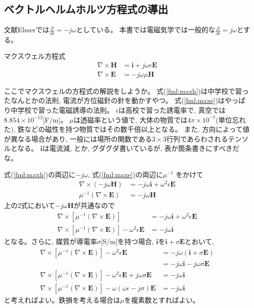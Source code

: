 \subsection{ベクトルヘルムホルツ方程式の導出}

文献Elmerでは$\frac{\partial}{\partial t}=-j\omega$としている。
本書では電磁気学では一般的な$\frac{\partial}{\partial t}=j\omega$とする。

マクスウェル方程式
\begin{align}
\nabla\times\bm{H}&=\bm{i}+j\omega\epsilon\bm{E}\label{fml:maxh}\\
\nabla\times\bm{E}&=-j\omega\mu\bm{H}\label{fml:maxe}
\end{align}

ここでマクスウェルの方程式の解説をしようか。
式(\ref{fml:maxh})は中学校で習ったなんとかの法則,
電流が方位磁針の針を動かすやつ。
式(\ref{fml:maxe})はやっぱり中学校で習った電磁誘導の法則。
$\epsilon$は高校で習った誘電率で,
真空では$8.854\times10^{-12}$[F/m]。
$\mu$は透磁率という値で,
大体の物質では$4\pi\times10^{-7}$(単位忘れた),
鉄などの磁性を持つ物質ではその数千倍以上となる。
また, 方向によって値が異なる場合があり,
一般には場所の関数である$3\times3$行列であらわされるテンソルとなる。
$\bm{i}$は電流減, とか, グダグダ書いているが, 表か箇条書きにすべきだな。

式(\ref{fml:maxh})の両辺に$-j\omega$,
式(\ref{fml:maxe})の両辺に$\mu^{-1}$ をかけて
\begin{align}
\nabla\times\left(-j\omega\bm{H}\right)
&=-j\omega\bm{i}+\omega^2\epsilon\bm{E}\\
\mu^{-1}\left(\nabla\times\bm{E}\right)
&=-j\omega\bm{H}
\end{align}
上の2式において$-j\omega\bm{H}$が共通なので
\begin{align}
\nabla\times\left[
\mu^{-1}\left(\nabla\times\bm{E}\right)
\right]
&=-j\omega\bm{i}+\omega^2\epsilon\bm{E}\\
\nabla\times\left[
\mu^{-1}\left(\nabla\times\bm{E}\right)
\right]-\omega^2\epsilon\bm{E}
&=-j\omega\bm{i}
\end{align}
となる。さらに, 媒質が導電率$\sigma$[S/m]を持つ場合,
$\bm{i}$を$\bm{i}+\sigma\bm{E}$とおいて,
\begin{align}
\nabla\times\left[
\mu^{-1}\left(\nabla\times\bm{E}\right)
\right]-\omega^2\epsilon\bm{E}
&=-j\omega\left(\bm{i}+\sigma\bm{E}\right)\\
&=-j\omega\bm{i}-j\omega\sigma\bm{E}\\
\nabla\times\left[
\mu^{-1}\left(\nabla\times\bm{E}\right)
\right]-\omega^2\epsilon\bm{E}+j\omega\sigma\bm{E}
&=-j\omega\bm{i}\\
\nabla\times\left[
\mu^{-1}\left(\nabla\times\bm{E}\right)
\right]-\omega\left(\omega\epsilon-j\sigma\right)\bm{E}
&=-j\omega\bm{i}
\end{align}
と考えればよい。鉄損を考える場合は$\mu$を複素数とすればよい。

